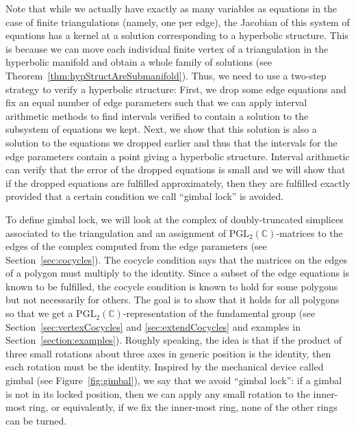 \documentclass[utopia,fullpage]{nmd/article}
\newcommand\C{\mathbb C}
\newcommand\myPGL[2]{\mathrm{PGL}_{#1}(#2)}
\begin{document}
Note that while we actually have exactly as many variables as equations in the case of finite triangulations (namely, one per edge), the Jacobian of this system of equations has a kernel at a solution corresponding to a hyperbolic structure.
This is because we can move each individual finite vertex of a triangulation in the hyperbolic manifold and obtain a whole family of solutions (see Theorem~\ref{thm:hypStructAreSubmanifold}). Thus, we need to use a two-step strategy to verify a hyperbolic structure: First, we drop some edge equations and fix an equal number of edge parameters such that we can apply interval arithmetic methods to find intervals verified to contain a solution to the subsystem of equations we kept. Next, we show that this solution is also a solution to the equations we dropped earlier and thus that the intervals for the edge parameters contain a point giving a hyperbolic structure. Interval arithmetic can verify that the error of the dropped equations is small and we will show that if the dropped equations are fulfilled approximately, then they are fulfilled exactly provided that a certain condition we call ``gimbal lock'' is avoided.

To define gimbal lock, we will look at the complex of doubly-truncated simplices associated to the triangulation and an assignment of $\myPGL{2}{\C}$-matrices to the edges of the complex computed from the edge parameters (see Section~\ref{sec:cocycles}). The cocycle condition says that the matrices on the edges of a polygon must multiply to the identity. Since a subset of the edge equations is known to be fulfilled, the cocycle condition is known to hold for some polygons but not necessarily for others. The goal is to show that it holds for all polygons so that we get a $\myPGL{2}{\C}$-representation of the fundamental group (see Section~\ref{sec:vertexCocycles} and \ref{sec:extendCocycles} and examples in Section~\ref{section:examples}). Roughly speaking, the idea is that if the product of three small rotations about three axes in generic position is the identity, then each rotation must be the identity. Inspired by the mechanical device called gimbal (see Figure~\ref{fig:gimbal}), we say that we avoid ``gimbal lock'': if a gimbal is not in its locked position, then we can apply any small rotation to the inner-most ring, or equivalently, if we fix the inner-most ring, none of the other rings can be turned.
\end{document}
